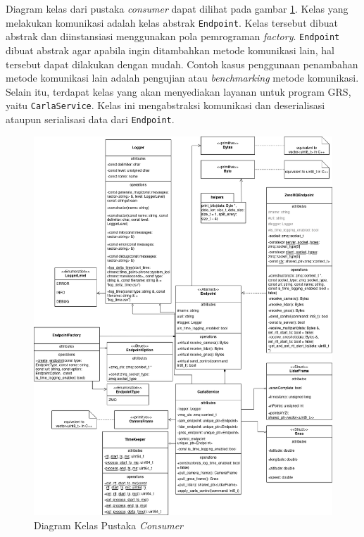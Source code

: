 Diagram kelas dari pustaka \textit{consumer} dapat dilihat pada gambar
\ref{chapter-4-consumer-class-diagram}. Kelas yang melakukan komunikasi adalah
kelas abstrak \texttt{Endpoint}. Kelas tersebut dibuat abstrak dan diinstansiasi
menggunakan pola pemrograman \textit{factory}. \texttt{Endpoint} dibuat abstrak
agar apabila ingin ditambahkan metode komunikasi lain, hal tersebut dapat
dilakukan dengan mudah. Contoh kasus penggunaan penambahan metode komunikasi
lain adalah pengujian atau \textit{benchmarking} metode komunikasi. Selain itu,
terdapat kelas yang akan menyediakan layanan untuk program GRS, yaitu
\texttt{CarlaService}. Kelas ini mengabstraksi komunikasi dan deserialisasi
ataupun serialisasi data dari \texttt{Endpoint}.
\begin{figure}[!htbp]
	\centering
	\includegraphics[width=1.0\textwidth]{resources/chapter-4/consumer-class_diagram.png}
	\caption{Diagram Kelas Pustaka \textit{Consumer}}
	\label{chapter-4-consumer-class-diagram}
\end{figure}

